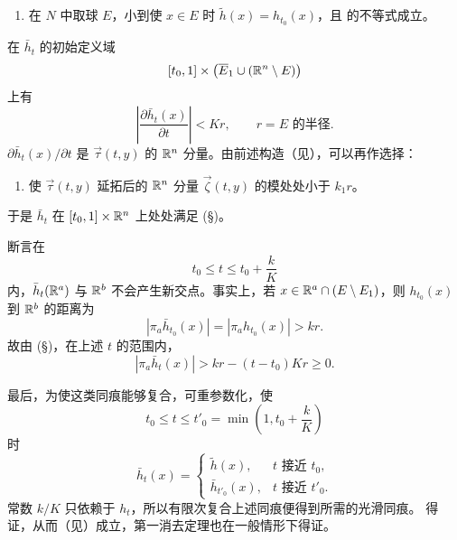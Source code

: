 \begin{enumerate}[label=(\alph*)]
  \item 在 $N$ 中取球 $E$，小到使 $x\in E$ 时 $\widetilde h(x)=h_{t_0}(x)$，且 的不等式成立。
\end{enumerate}
在 $\bar h_t$ 的初始定义域
\[
  [t_0,1]\times\bigl(\overline E_1\cup(\mathbb{R}^n\setminus E)\bigr)
\]
上有
\[
  \left|\frac{\partial\bar h_t(x)}{\partial t}\right|<Kr,
  \qquad r=E\text{ 的半径}. \tag{\S}
\]
$\partial\bar h_t(x)/\partial t$ 是 $\vec\tau(t,y)$ 的 $\mathbb{R}^n$ 分量。由前述构造（见），可以再作选择：
\begin{enumerate}[label=(\alph*),start=2]
  \item 使 $\vec\tau(t,y)$ 延拓后的 $\mathbb{R}^n$ 分量 $\vec\zeta(t,y)$ 的模处处小于 $k_1r$。
\end{enumerate}
于是 $\bar h_t$ 在 $[t_0,1]\times\mathbb{R}^n$ 上处处满足 (\S)。

断言在
\[
  t_0\leq t\leq t_0+\frac{k}{K}
\]
内，$\bar h_t(\mathbb{R}^a)$ 与 $\mathbb{R}^b$ 不会产生新交点。事实上，若
$x\in\mathbb{R}^a\cap(E\setminus E_1)$，则 $h_{t_0}(x)$ 到 $\mathbb{R}^b$ 的距离为
\[
  |\pi_a\bar h_{t_0}(x)|
  =|\pi_a h_{t_0}(x)|>kr.
\]
故由 (\S)，在上述 $t$ 的范围内，
\[
  |\pi_a\bar h_t(x)|
  >kr-(t-t_0)Kr\geq0.
\]

最后，为使这类同痕能够复合，可重参数化，使
\[
  t_0\leq t\leq t'_0
  =\min\left(1,t_0+\frac{k}{K}\right)
\]
时
\[
  \bar h_t(x)=
  \begin{cases}
    \widetilde h(x),&t\text{ 接近 }t_0,\\
    \bar h_{t'_0}(x),&t\text{ 接近 }t'_0.
  \end{cases}
\]
常数 $k/K$ 只依赖于 $h_t$，所以有限次复合上述同痕便得到所需的光滑同痕。 得证，从而（见）成立，第一消去定理也在一般情形下得证。\label{proof:5-6-end}
\EndProof
